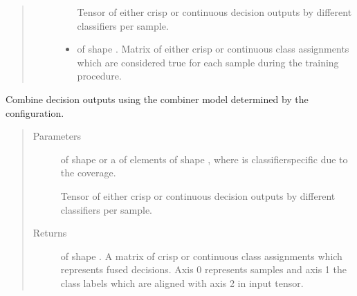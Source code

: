 \documentclass[letterpaper,10pt,english]{sphinxmanual}
\begin{document}
\begin{fulllineitems}
\begin{fulllineitems}
\begin{quote}
\begin{description}
\begin{itemize}
\sphinxAtStartPar
Tensor of either crisp or continuous decision outputs by different classifiers per sample.


\item {} 
\sphinxAtStartPar
{} \textendash{}  of shape .
Matrix of either crisp or continuous class assignments which are considered true for each sample during
the training procedure.

\end{itemize}

\end{description}\end{quote}

\end{fulllineitems}


\begin{fulllineitems}
\label{\detokenize{pusion.control.decision_processor:pusion.control.decision_processor.DecisionProcessor.combine}}
\sphinxAtStartPar
Combine decision outputs using the combiner model determined by the configuration.
\begin{quote}\begin{description}
\item[{Parameters}] \leavevmode
\sphinxAtStartPar
{} \textendash{} 
\sphinxAtStartPar
{} of shape  or a  of
 elements of shape , where  is classifier\sphinxhyphen{}specific
due to the coverage.

\sphinxAtStartPar
Tensor of either crisp or continuous decision outputs by different classifiers per sample.


\item[{Returns}] \leavevmode
\sphinxAtStartPar
{} of shape . A matrix of crisp or continuous class assignments
which represents fused decisions. Axis 0 represents samples and axis 1 the class labels which are
aligned with axis 2 in  input tensor.


\end{description}
\end{quote}
\end{fulllineitems}
\end{fulllineitems}
\end{document}

